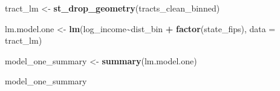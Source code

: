 \documentclass[
]{article}
\newenvironment{Shaded}{\begin{snugshade}}{\end{snugshade}}
\newcommand{\AttributeTok}[1]{\textcolor[rgb]{0.13,0.29,0.53}{#1}}
\newcommand{\FunctionTok}[1]{\textcolor[rgb]{0.13,0.29,0.53}{\textbf{#1}}}
\newcommand{\NormalTok}[1]{#1}
\newcommand{\OtherTok}[1]{\textcolor[rgb]{0.56,0.35,0.01}{#1}}
\newcommand{\SpecialCharTok}[1]{\textcolor[rgb]{0.81,0.36,0.00}{\textbf{#1}}}
\newcommand{\StringTok}[1]{\textcolor[rgb]{0.31,0.60,0.02}{#1}}
\begin{document}
\begin{Shaded}
\end{Shaded}

\begin{Shaded}
\begin{Highlighting}[]
\NormalTok{tract\_lm }\OtherTok{\textless{}{-}} \FunctionTok{st\_drop\_geometry}\NormalTok{(tracts\_clean\_binned)}

\NormalTok{lm.model.one }\OtherTok{\textless{}{-}} \FunctionTok{lm}\NormalTok{(log\_income}\SpecialCharTok{\textasciitilde{}}\NormalTok{dist\_bin }\SpecialCharTok{+} \FunctionTok{factor}\NormalTok{(state\_fips), }\AttributeTok{data =}\NormalTok{ tract\_lm)}

\NormalTok{model\_one\_summary }\OtherTok{\textless{}{-}} \FunctionTok{summary}\NormalTok{(lm.model.one)}

\NormalTok{model\_one\_summary}
\end{Highlighting}
\end{Shaded}
\end{document}
